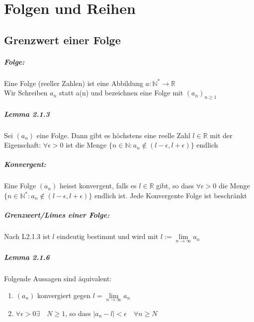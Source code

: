 \documentclass[8pt]{extreport}
\begin{document}
\chapter{Folgen und Reihen}
\section{Grenzwert einer Folge}

\paragraph{Folge:} Eine Folge (reeller Zahlen) ist eine Abbildung $a:\mathbb{N}^* \rightarrow \mathbb{R}$\\
Wir Schreiben $a_{n}$ statt a(n) und bezeichnen eine Folge mit $(a_{n})_{n\geq 1}$
\paragraph{Lemma 2.1.3} Sei $(a_{n})$ eine Folge. Dann gibt es höchstens eine reelle Zahl $\mathit{l} \in \mathbb{R}$ mit der Eigenschaft: $\forall \epsilon > 0$ ist die Menge $\{ n \in \mathbb{N} : a_{n} \notin (\mathit{l - \epsilon},\mathit{l+\epsilon}) \}$ endlich
\paragraph{Konvergent:} Eine Folge $(a_{n})$ heisst konvergent, falls es $\mathit{l} \in \mathbb{R}$ gibt, so dass $\forall \epsilon > 0$ die Menge $\{ n \in \mathbb{N}^* : a_{n} \notin (\mathit{l - \epsilon},\mathit{l + \epsilon})\}$ endlich ist.
Jede Konvergente Folge ist beschränkt
\paragraph{Grenzwert/Limes einer Folge:} Nach L2.1.3 ist $\mathit{l}$ eindeutig bestimmt und wird mit $\mathit{l} := \lim \limits_{ n \to \infty} a_{n}$
\paragraph{Lemma 2.1.6} Folgende Aussagen sind äquivalent:
\begin{enumerate}
\item $(a_{n})$ konvergiert gegen $\mathit{l} = \lim\limits_{n \to \infty} a_{n}$
\item $\forall \epsilon > 0 \exists \quad N \geq 1$, so dass $|a_{n} - \mathit{l}| < \epsilon \quad \forall n\geq N$
\end{enumerate}
\end{document}
